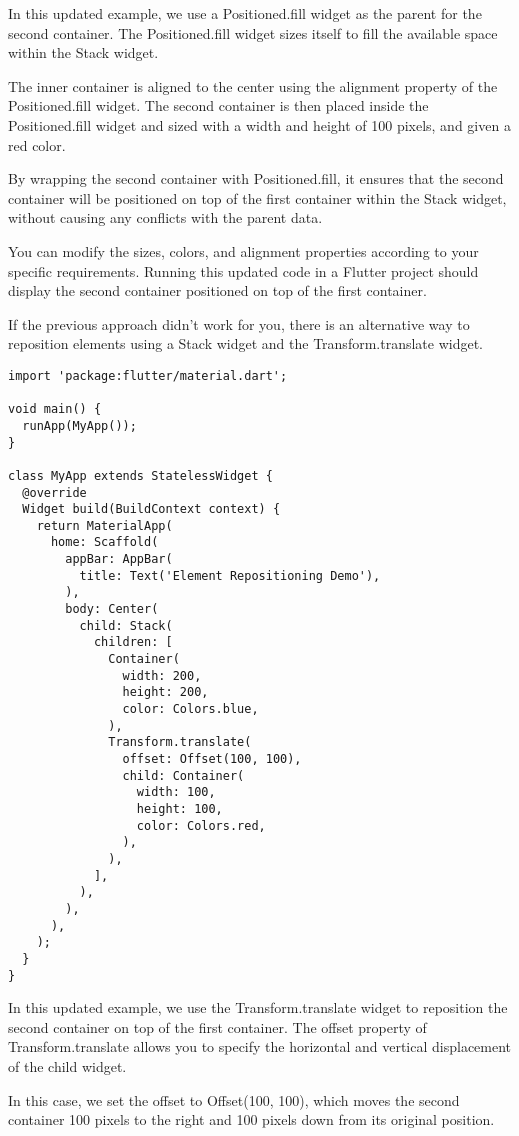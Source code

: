 In this updated example, we use a Positioned.fill widget as the parent for the second container. The Positioned.fill 
widget sizes itself to fill the available space within the Stack widget.

The inner container is aligned to the center using the alignment property of the Positioned.fill widget. 
The second container is then placed inside the Positioned.fill widget and sized with a width and height of 
100 pixels, and given a red color.

By wrapping the second container with Positioned.fill, it ensures that the second container will be positioned 
on top of the first container within the Stack widget, without causing any conflicts with the parent data.

You can modify the sizes, colors, and alignment properties according to your specific requirements. Running this 
updated code in a Flutter project should display the second container positioned on top of the first container.


If the previous approach didn't work for you, there is an alternative way to reposition elements using a Stack 
widget and the Transform.translate widget.

\begin{lstlisting}
import 'package:flutter/material.dart';

void main() {
  runApp(MyApp());
}

class MyApp extends StatelessWidget {
  @override
  Widget build(BuildContext context) {
    return MaterialApp(
      home: Scaffold(
        appBar: AppBar(
          title: Text('Element Repositioning Demo'),
        ),
        body: Center(
          child: Stack(
            children: [
              Container(
                width: 200,
                height: 200,
                color: Colors.blue,
              ),
              Transform.translate(
                offset: Offset(100, 100),
                child: Container(
                  width: 100,
                  height: 100,
                  color: Colors.red,
                ),
              ),
            ],
          ),
        ),
      ),
    );
  }
}
\end{lstlisting}

In this updated example, we use the Transform.translate widget to reposition the second container on top of the 
first container. The offset property of Transform.translate allows you to specify the horizontal and vertical 
displacement of the child widget.

In this case, we set the offset to Offset(100, 100), which moves the second container 100 pixels to the right and 
100 pixels down from its original position.


